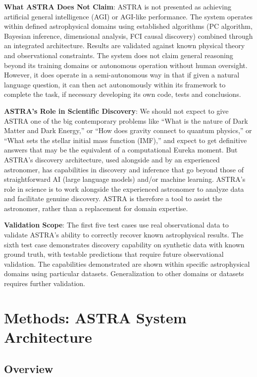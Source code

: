 \documentclass[usenatbib]{rasti}
\begin{document}
\textbf{What ASTRA Does Not Claim}: ASTRA is not presented as achieving artificial general intelligence (AGI) or AGI-like performance. The system operates within defined astrophysical domains using established algorithms (PC algorithm, Bayesian inference, dimensional analysis, FCI causal discovery) combined through an integrated architecture. Results are validated against known physical theory and observational constraints. The system does not claim general reasoning beyond its training domains or autonomous operation without human oversight. However, it does operate in a semi-autonomous way in that if given a natural language question, it can then act autonomously within its framework to complete the task, if necessary developing its own code, tests and conclusions.

\textbf{ASTRA's Role in Scientific Discovery}: We should not expect to give ASTRA one of the big contemporary problems like ``What is the nature of Dark Matter and Dark Energy,'' or ``How does gravity connect to quantum physics,'' or ``What sets the stellar initial mass function (IMF),'' and expect to get definitive answers that may be the equivalent of a computational Eureka moment. But ASTRA's discovery architecture, used alongside and by an experienced astronomer, has capabilities in discovery and inference that go beyond those of straightforward AI (large language models) and/or machine learning. ASTRA's role in science is to work alongside the experienced astronomer to analyze data and facilitate genuine discovery. ASTRA is therefore a tool to assist the astronomer, rather than a replacement for domain expertise.

\textbf{Validation Scope}: The first five test cases use real observational data to validate ASTRA's ability to correctly recover known astrophysical results. The sixth test case demonstrates discovery capability on synthetic data with known ground truth, with testable predictions that require future observational validation. The capabilities demonstrated are shown within specific astrophysical domains using particular datasets. Generalization to other domains or datasets requires further validation.

\section{Methods: ASTRA System Architecture}

\subsection{Overview}
\end{document}
